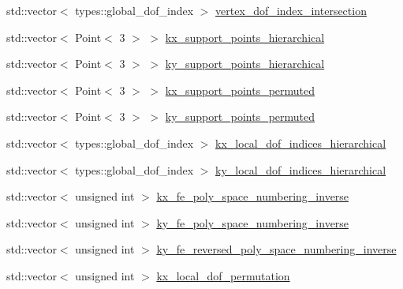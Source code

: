 \begin{DoxyCompactItemize}
\item 
std\+::vector$<$ types\+::global\+\_\+dof\+\_\+index $>$ \hyperlink{structLaplaceBEM_1_1PairCellWiseScratchData_a2001013e06428347d301c51380dfe9c8}{vertex\+\_\+dof\+\_\+index\+\_\+intersection}
\item 
std\+::vector$<$ Point$<$ 3 $>$ $>$ \hyperlink{structLaplaceBEM_1_1PairCellWiseScratchData_a3d2f3d03a4c9edd68c5b6e23707a0284}{kx\+\_\+support\+\_\+points\+\_\+hierarchical}
\item 
std\+::vector$<$ Point$<$ 3 $>$ $>$ \hyperlink{structLaplaceBEM_1_1PairCellWiseScratchData_ab87c5e42ccd17d45d97052bda9576dce}{ky\+\_\+support\+\_\+points\+\_\+hierarchical}
\item 
std\+::vector$<$ Point$<$ 3 $>$ $>$ \hyperlink{structLaplaceBEM_1_1PairCellWiseScratchData_a32b2da930b6ad0488446e5b28da7565d}{kx\+\_\+support\+\_\+points\+\_\+permuted}
\item 
std\+::vector$<$ Point$<$ 3 $>$ $>$ \hyperlink{structLaplaceBEM_1_1PairCellWiseScratchData_a998570a30f2cf4069e2e08430b253ead}{ky\+\_\+support\+\_\+points\+\_\+permuted}
\item 
std\+::vector$<$ types\+::global\+\_\+dof\+\_\+index $>$ \hyperlink{structLaplaceBEM_1_1PairCellWiseScratchData_a2f1f9ec98f5c725bef002e01259d95a2}{kx\+\_\+local\+\_\+dof\+\_\+indices\+\_\+hierarchical}
\item 
std\+::vector$<$ types\+::global\+\_\+dof\+\_\+index $>$ \hyperlink{structLaplaceBEM_1_1PairCellWiseScratchData_a04052a9ef0a6f5ab440ffed7c1727e32}{ky\+\_\+local\+\_\+dof\+\_\+indices\+\_\+hierarchical}
\item 
std\+::vector$<$ unsigned int $>$ \hyperlink{structLaplaceBEM_1_1PairCellWiseScratchData_a5292871002dbf2bb4fdf33b255123862}{kx\+\_\+fe\+\_\+poly\+\_\+space\+\_\+numbering\+\_\+inverse}
\item 
std\+::vector$<$ unsigned int $>$ \hyperlink{structLaplaceBEM_1_1PairCellWiseScratchData_a4970716b43febb26cca3705cbcee97ce}{ky\+\_\+fe\+\_\+poly\+\_\+space\+\_\+numbering\+\_\+inverse}
\item 
std\+::vector$<$ unsigned int $>$ \hyperlink{structLaplaceBEM_1_1PairCellWiseScratchData_a444fccb04e87630f9614792070e71238}{ky\+\_\+fe\+\_\+reversed\+\_\+poly\+\_\+space\+\_\+numbering\+\_\+inverse}
\item 
std\+::vector$<$ unsigned int $>$ \hyperlink{structLaplaceBEM_1_1PairCellWiseScratchData_a32bf7e5a46d34fec6116bd2ec75f94c9}{kx\+\_\+local\+\_\+dof\+\_\+permutation}
\item 

\end{DoxyCompactItemize}
